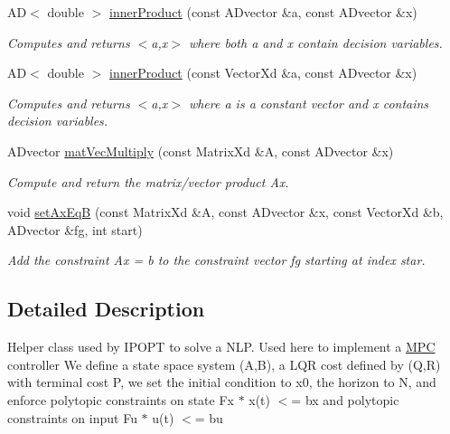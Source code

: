 \begin{DoxyCompactItemize}
AD$<$ double $>$ \mbox{\hyperlink{classFG__eval_a3938a02d039cc343f88a444d13289cc1}{inner\+Product}} (const A\+Dvector \&a, const A\+Dvector \&x)
\begin{DoxyCompactList}\small\item\em Computes and returns $<$a,x$>$ where both a and x contain decision variables. \end{DoxyCompactList}\item 
\mbox{\label{classFG__eval_a8d198d976aba16c940570fff2ac1ade6}} 
AD$<$ double $>$ \mbox{\hyperlink{classFG__eval_a8d198d976aba16c940570fff2ac1ade6}{inner\+Product}} (const Vector\+Xd \&a, const A\+Dvector \&x)
\begin{DoxyCompactList}\small\item\em Computes and returns $<$a,x$>$ where a is a constant vector and x contains decision variables. \end{DoxyCompactList}\item 
\mbox{\label{classFG__eval_a20f32730fd659427de307cf9fe9fe940}} 
A\+Dvector \mbox{\hyperlink{classFG__eval_a20f32730fd659427de307cf9fe9fe940}{mat\+Vec\+Multiply}} (const Matrix\+Xd \&A, const A\+Dvector \&x)
\begin{DoxyCompactList}\small\item\em Compute and return the matrix/vector product Ax. \end{DoxyCompactList}\item 
\mbox{\label{classFG__eval_a32e59236a0889df4239e43034ad1bbf1}} 
void \mbox{\hyperlink{classFG__eval_a32e59236a0889df4239e43034ad1bbf1}{set\+Ax\+EqB}} (const Matrix\+Xd \&A, const A\+Dvector \&x, const Vector\+Xd \&b, A\+Dvector \&fg, int start)
\begin{DoxyCompactList}\small\item\em Add the constraint Ax = b to the constraint vector fg starting at index star. \end{DoxyCompactList}\end{DoxyCompactItemize}


\subsection{Detailed Description}
Helper class used by I\+P\+O\+PT to solve a N\+LP. Used here to implement a \mbox{\hyperlink{classMPC}{M\+PC}} controller We define a state space system (A,B), a L\+QR cost defined by (Q,R) with terminal cost P, we set the initial condition to x0, the horizon to N, and enforce polytopic constraints on state Fx $\ast$ x(t) $<$= bx and polytopic constraints on input Fu $\ast$ u(t) $<$= bu 

